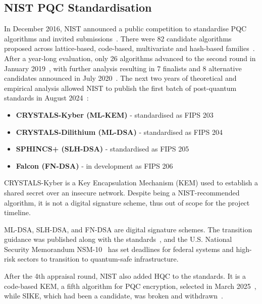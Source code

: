 \documentclass[12pt,a4paper]{article}
\begin{document}
\subsection{NIST PQC Standardisation}

In December 2016, NIST announced a public competition to standardise PQC algorithms and invited submissions~\cite{nist-pqc-call-2016}. There were 82 candidate algorithms proposed across lattice-based, code-based, multivariate and hash-based families~\cite{nist-pqc-timeline,nist-round2-2019}. After a year-long evaluation, only 26 algorithms advanced to the second round in January 2019~\cite{nist-round2-2019}, with further analysis resulting in 7 finalists and 8 alternative candidates announced in July 2020~\cite{nist-round3-2020}. The next two years of theoretical and empirical analysis allowed NIST to publish the first batch of post-quantum standards in August 2024~\cite{nist-fips-203-2024,nist-fips-204-2024,nist-fips-205-2024,nist-fips206-2024}:

\begin{itemize}
    \item \textbf{CRYSTALS-Kyber (ML-KEM)} - standardised as FIPS 203~\cite{nist-fips-203-2024}
    \item \textbf{CRYSTALS-Dilithium (ML-DSA)} - standardised as FIPS 204~\cite{nist-fips-204-2024}
    \item \textbf{SPHINCS+ (SLH-DSA)} - standardised as FIPS 205~\cite{nist-fips-205-2024}
    \item \textbf{Falcon (FN-DSA)} - in development as FIPS 206~\cite{nist-fips206-2024}
\end{itemize}

CRYSTALS-Kyber is a Key Encapsulation Mechanism (KEM) used to establish a shared secret over an insecure network. Despite being a NIST-recommended algorithm, it is not a digital signature scheme, thus out of scope for the project timeline.

ML-DSA, SLH-DSA, and FN-DSA are digital signature schemes. The transition guidance was published along with the standards~\cite{nist-ir8547-2024,nist-nccoe-pqc-migration-2023}, and the U.S. National Security Memorandum NSM-10~\cite{nsm-10-2022} has set deadlines for federal systems and high-risk sectors to transition to quantum-safe infrastructure. 

After the 4th appraisal round, NIST also added HQC to the standards. It is a code-based KEM, a fifth algorithm for PQC encryption, selected in March 2025~\cite{nist-hqc-selection-2025,nist-ir8545-2025}, while SIKE, which had been a candidate, was broken and withdrawn~\cite{sike-broken-2022}.
\end{document}
